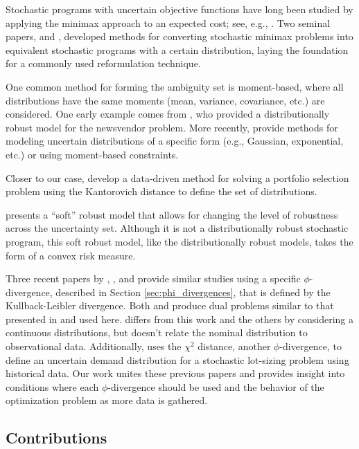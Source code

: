 \documentclass[opre,nonblindrev]{informs3} %
\begin{document}
Stochastic programs with uncertain objective functions have long been studied by applying the minimax approach to an expected cost; see, e.g., \cite{zackova1966minimax,dupacova_87}.
Two seminal papers, \cite{shapiro2002minimax} and \cite{shapiro2004class}, developed methods for converting stochastic minimax problems into equivalent stochastic programs with a certain distribution, laying the foundation for a commonly used reformulation technique.

One common method for forming the ambiguity set is moment-based, where all distributions have the same moments (mean, variance, covariance, etc.) are considered.
One early example comes from \cite{scarf1958min}, who provided a distributionally robust model for the newsvendor problem.
More recently, \cite{delage2010distributionally} provide methods for modeling uncertain distributions of a specific form (e.g., Gaussian, exponential, etc.) or using moment-based constraints.

Closer to our case, \cite{pflug2007ambiguity} develop a data-driven method for solving a portfolio selection problem using the Kantorovich distance to define the set of distributions.

\cite{bental2010soft} presents a ``soft'' robust model that allows for changing the level of robustness across the uncertainty set.
Although it is not a distributionally robust stochastic program, this soft robust model, like the distributionally robust models, takes the form of a convex risk measure.

Three recent papers by \cite{wang2010likelihood}, \cite{calafiore2007ambiguous}, and \cite{hukullback} provide similar studies using a specific $\phi$-divergence, described in Section \ref{sec:phi_divergences}, that is defined by the Kullback-Leibler divergence.
Both \cite{wang2010likelihood} and \cite{hukullback} produce dual problems similar to that presented in \cite{bental2011robust} and used here.
\cite{hukullback} differs from this work and the others by considering a continuous distributions, but doesn't relate the nominal distribution to observational data.
Additionally, \cite{klabjan2013robust} uses the $\chi^2$ distance, another $\phi$-divergence, to define an uncertain demand distribution for a stochastic lot-sizing problem using historical data.
Our work unites these previous papers and provides insight into conditions where each $\phi$-divergence should be used and the behavior of the optimization problem as more data is gathered.

\subsection{Contributions}
\end{document}
